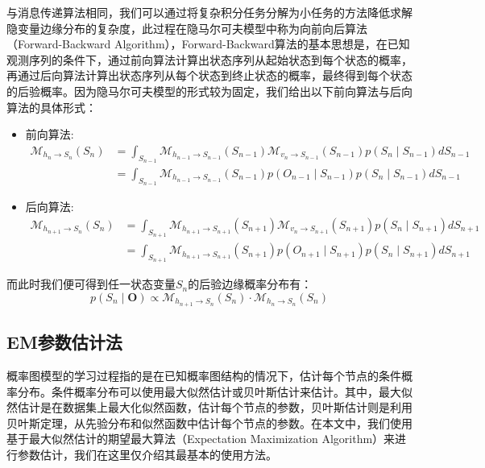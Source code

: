 \documentclass{xdupgthesis}
\begin{document}
与消息传递算法相同，我们可以通过将复杂积分任务分解为小任务的方法降低求解隐变量边缘分布的复杂度，此过程在隐马尔可夫模型中称为向前向后算法（Forward-Backward Algorithm），Forward-Backward算法的基本思想是，在已知观测序列的条件下，通过前向算法计算出状态序列从起始状态到每个状态的概率，再通过后向算法计算出状态序列从每个状态到终止状态的概率，最终得到每个状态的后验概率。因为隐马尔可夫模型的形式较为固定，我们给出以下前向算法与后向算法的具体形式：
\begin{itemize}
    \item 前向算法:
    \begin{equation}
        \begin{aligned} 
            \mathcal{M}_{h_n \rightarrow S_{n}}\left(S_{n}\right)&=\int_{S_{n-1}} \mathcal{M}_{h_{n-1} \rightarrow S_{n-1}}\left(S_{n-1}\right) \mathcal{M}_{v_n \rightarrow S_{n-1}}\left(S_{n-1}\right) p\left(S_{n} \mid S_{n-1}\right) d S_{n-1}\\
          &=\int_{S_{n-1}} \mathcal{M}_{h_{n-1} \rightarrow S_{n-1}}\left(S_{n-1}\right) p(O_{n-1}\mid S_{n-1}) p\left(S_{n} \mid S_{n-1}\right) d S_{n-1}
          \end{aligned}
    \end{equation}
    \item 后向算法:
    \begin{equation}
        \begin{aligned} 
            \mathcal{M}_{h_{n+1} \rightarrow S_{n}}\left(S_{n}\right)&=\int_{S_{n+1}} \mathcal{M}_{h_{n+1} \rightarrow S_{n+1}}\left(S_{n+1}\right) \mathcal{M}_{v_n \rightarrow S_{n+1}}\left(S_{n+1}\right) p\left(S_{n} \mid S_{n+1}\right) d S_{n+1}\\
          &=\int_{S_{n+1}} \mathcal{M}_{h_{n+1} \rightarrow S_{n+1}}\left(S_{n+1}\right) p(O_{n+1}\mid S_{n+1}) p\left(S_{n} \mid S_{n+1}\right) d S_{n+1}
          \end{aligned}          
    \end{equation}
\end{itemize}
而此时我们便可得到任一状态变量$S_n$的后验边缘概率分布有：
\begin{equation}
    p(S_n\mid \mathbf{O}) \propto \mathcal{M}_{h_{n+1} \rightarrow S_{n}}\left(S_{n}\right)  \cdot \mathcal{M}_{h_n \rightarrow S_{n}}\left(S_{n}\right)
\end{equation}



\subsection{EM参数估计法}
概率图模型的学习过程指的是在已知概率图结构的情况下，估计每个节点的条件概率分布。条件概率分布可以使用最大似然估计或贝叶斯估计来估计。其中，最大似然估计是在数据集上最大化似然函数，估计每个节点的参数，贝叶斯估计则是利用贝叶斯定理，从先验分布和似然函数中估计每个节点的参数\cite{larranaga2013review}。在本文中，我们使用基于最大似然估计的期望最大算法（Expectation Maximization Algorithm）\cite{EM,EMBG}来进行参数估计，我们在这里仅介绍其最基本的使用方法。
\end{document}
